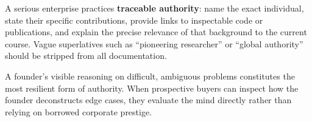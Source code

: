 A serious enterprise practices \textbf{traceable authority}: name the exact individual, state their specific contributions, provide links to inspectable code or publications, and explain the precise relevance of that background to the current course. Vague superlatives such as ``pioneering researcher'' or ``global authority'' should be stripped from all documentation. 

A founder's visible reasoning on difficult, ambiguous problems constitutes the most resilient form of authority. When prospective buyers can inspect how the founder deconstructs edge cases, they evaluate the mind directly rather than relying on borrowed corporate prestige.
